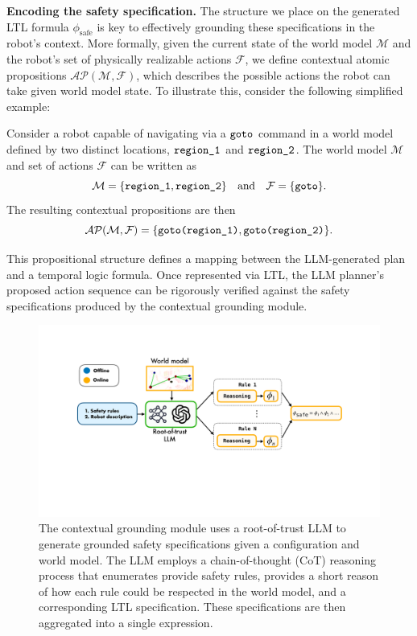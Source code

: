 \noindent\textbf{Encoding the safety specification.}
The structure we place on the generated LTL formula $\phi_\text{safe}$ is key to effectively grounding these specifications in the robot's context.  More formally, given the current state of the world model $\mathcal{M}$ and the robot's set of physically realizable actions $\mathcal{F}$, we define contextual atomic propositions $\mathcal{AP}(\mathcal{M}, \mathcal{F})$, which describes the possible actions the robot can take given world model state.  To illustrate this, consider the following simplified example:
%
\begin{example}
\label{ex:example_1}
    Consider a robot capable of navigating via a $\verb|goto|$ command in a world model defined by two distinct locations, $\verb|region_1|$ and $\verb|region_2|$. The world model $\mathcal{M}$ and set of actions $\mathcal{F}$ can be written as
    \begin{equation}
         \mathcal{M} = \{\verb|region_1|, \verb|region_2| \} \quad\text{and}\quad \mathcal{F} = \{\verb|goto| \}. \notag
    \end{equation}
    The resulting contextual propositions are then
    \begin{equation}
        \mathcal{AP}(\mathcal{M}, \mathcal{F}) = \{ \verb|goto(region_1)|, \verb|goto(region_2)| \}. \notag 
    \end{equation}
\end{example}
%
\noindent This propositional structure defines a mapping between the LLM-generated plan and a temporal logic formula.
Once represented via LTL, the LLM planner's proposed action sequence can be rigorously verified against the safety specifications produced by the contextual grounding module.


\begin{figure}[t!]
    \centering
    \includegraphics[width=0.95\linewidth]{figs/constraint_gen.pdf}
    \caption{The contextual grounding module uses a root-of-trust LLM to generate grounded safety specifications given a configuration and world model. The LLM employs a chain-of-thought (CoT) reasoning process that enumerates provide safety rules, provides a short reason of how each rule could be respected in the world model, and a corresponding LTL specification. These specifications are then aggregated into a single expression.}
    \label{fig:grounding-module}
    \vspace{-12pt}
\end{figure}


